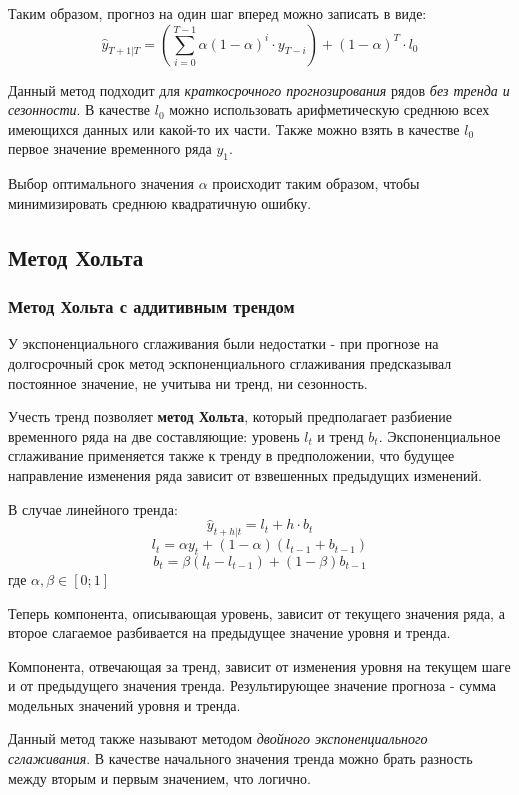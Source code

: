 \documentclass[aps,%
12pt,%
final,%
oneside,
onecolumn,%
musixtex, %
superscriptaddress,%
centertags]{article} %
\theoremstyle{plain}
\theoremstyle{definition}
\theoremstyle{remark}
\begin{document}
Таким образом, прогноз на один шаг вперед можно записать в виде:
$$\hat{y}_{T+1|T} = \left(\sum\limits_{i=0}^{T-1} \alpha(1-\alpha)^i \cdot y_{T-i} \right) + (1-\alpha)^T \cdot l_0$$

Данный метод подходит для \textit{краткосрочного прогнозирования} рядов \textit{без тренда и сезонности}. В качестве $l_0$ можно использовать арифметическую среднюю всех имеющихся данных или какой-то их части. Также можно взять в качестве $l_0$ первое значение временного ряда $y_1$.

Выбор оптимального значения $\alpha$ происходит таким образом, чтобы минимизировать среднюю квадратичную ошибку.

\newpage

\subsection{Метод Хольта}

\subsubsection{Метод Хольта с аддитивным трендом}

У экспоненциального сглаживания были недостатки - при прогнозе на долгосрочный срок метод эскпоненциального сглаживания предсказывал постоянное значение, не учитыва ни тренд, ни сезонность.

Учесть тренд позволяет \textbf{метод Хольта}, который предполагает разбиение временного ряда на две составляющие: уровень $l_t$ и тренд $b_t$. Экспоненциальное сглаживание применяется также к тренду в предположении, что будущее направление изменения ряда зависит от взвешенных предыдущих изменений. 

В случае линейного тренда:
$$\hat{y}_{t+h|t} = l_t + h \cdot b_t$$
$$l_t = \alpha y_t + (1-\alpha)(l_{t-1}+b_{t-1})$$ 
$$b_t = \beta(l_t-l_{t-1}) + (1-\beta)b_{t-1}$$
где $\alpha,\beta \in [0;1]$

Теперь компонента, описывающая уровень, зависит от текущего значения ряда, а второе слагаемое разбивается на предыдущее значение уровня и тренда.

Компонента, отвечающая за тренд, зависит от изменения уровня на текущем шаге и от предыдущего значения тренда. Результирующее значение прогноза - сумма модельных значений уровня и тренда. 

Данный метод также называют методом \textit{двойного экспоненциального сглаживания}. В качестве начального значения тренда можно брать разность между вторым и первым значением, что логично.
\end{document}
